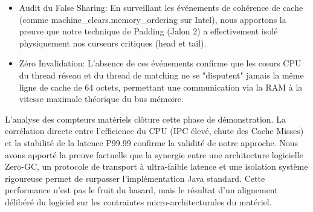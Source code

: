 \begin{itemize}
    \item Audit du False Sharing: En surveillant les événements de cohérence de cache (comme machine\_clears.memory\_ordering sur Intel), nous apportons la preuve que notre technique de Padding (Jalon 2) a effectivement isolé physiquement nos curseurs critiques (head et tail).
    \item Zéro Invalidation: L'absence de ces événements confirme que les cœurs CPU du thread réseau et du thread de matching ne se "disputent" jamais la même ligne de cache de 64 octets, permettant une communication via la RAM à la vitesse maximale théorique du bus mémoire.
\end{itemize}

L'analyse des compteurs matériels clôture cette phase de démonstration. La corrélation directe entre l'efficience du CPU (IPC élevé, chute des Cache Misses) et la stabilité de la latence P99.99 confirme la validité de notre approche. Nous avons apporté la preuve factuelle que la synergie entre une architecture logicielle Zero-GC, un protocole de transport à ultra-faible latence et une isolation système rigoureuse permet de surpasser l'implémentation Java standard. Cette performance n'est pas le fruit du hasard, mais le résultat d'un alignement délibéré du logiciel sur les contraintes micro-architecturales du matériel.